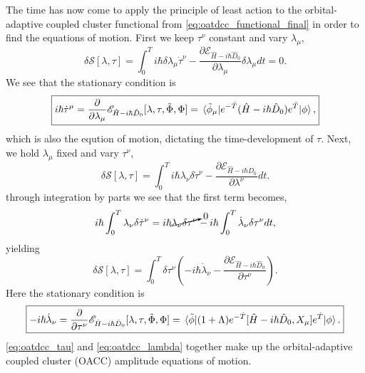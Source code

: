 The time has now come to apply the principle of least action to the orbital-adaptive 
coupled cluster functional from \autoref{eq:oatdcc_functional_final} in order to 
find the equations of motion. First we keep $\tau^\nu$ constant and vary $\lambda_\mu$,
\begin{equation}
    \delta\mathcal{S}[\lambda, \tau] 
    = \int_0^T i\hbar 
        \delta\lambda_\mu\dot{\tau}^\nu 
        - \frac{\partial \mathscr{E}_{\hat{H} - i\hbar \hat{D}_0}}{\partial \lambda_\mu} 
            \delta\lambda_\mu
    dt = 0.
\end{equation}
We see that the stationary condition is 
\begin{equation}
    \label{eq:oatdcc_tau}
    \boxed{
    i\hbar \dot{\tau}^\mu 
    = \frac{\partial}{\partial \lambda_\mu}
        \mathscr{E}_{\hat{H} -i \hbar \hat{D}_0}[\lambda, \tau, \tilde{\Phi}, \Phi]
    = \mel*{\tilde{\phi}_\mu}
        {e^{-\hat{T}}(\hat{H} - i\hbar \hat{D}_0)e^{\hat{T}}}{\phi},
    }
\end{equation}
which is also the eqution of motion, dictating the time-development of $\tau$. Next, 
we hold $\lambda_\mu$ fixed and vary $\tau^\nu$,
\begin{equation}
    \delta \mathcal{S}[\lambda, \tau]
    = \int_0^T
        i\hbar \lambda_\nu \delta \dot{\tau}^\nu
        - \frac{\partial \mathscr{E}_{\hat{H} - i\hbar\hat{D}_0}}{\partial \lambda^\nu} 
    dt. 
\end{equation}
through integration by parts we see that the first term becomes,
\begin{equation*}
    i\hbar\int_0^T \lambda_\nu \delta\dot{\tau}^\nu
    = i\hbar\cancelto{0}{\lambda_\nu\delta\tau^\nu}
    - i\hbar \int_0^T \dot{\lambda}_\nu \delta\tau^\nu dt,
\end{equation*}
yielding 
\begin{equation}
    \delta\mathcal{S}[\lambda, \tau] 
    = \int_0^T \delta \tau^\nu \left(-i\hbar\dot{\lambda}_\nu 
    -\frac{\partial \mathscr{E}_{\hat{H} - i\hbar\hat{D}_0}}{\partial\tau^\nu} \right).
\end{equation}
Here the stationary condition is 
\begin{equation}
    \label{eq:oatdcc_lambda}
    \boxed{
    -i\hbar\dot{\lambda}_\nu = \frac{\partial}{\partial \tau^\nu}
    \mathscr{E}_{\hat{H} - i\hbar\hat{D}_0}[\lambda, \tau, \tilde{\Phi}, \Phi]
    = \mel*{\tilde{\phi}}
        {(1 + \Lambda)e^{-\hat{T}}[\hat{H} -i\hbar\hat{D}_0, X_\mu]e^{\hat{T}}
        }{\phi}.
    }
\end{equation}
\autoref{eq:oatdcc_tau} and \autoref{eq:oatdcc_lambda} together make up the orbital-adaptive 
coupled cluster (OACC) amplitude equations of motion.

